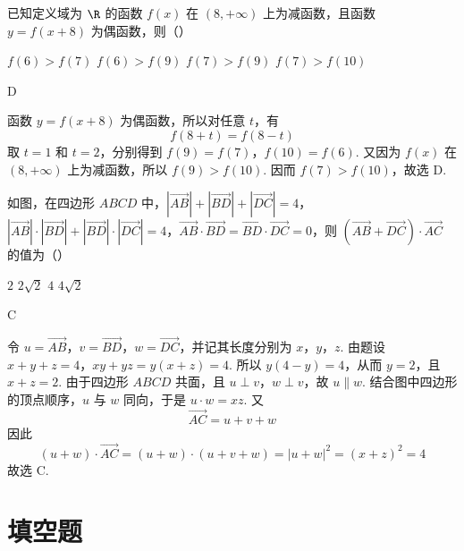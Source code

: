 \begin{problem}
已知定义域为 \(\R\) 的函数 \(f(x)\) 在 \((8, +\infty)\) 上为减函数，且函数 \(y = f(x + 8)\) 为偶函数，则（\quad）

\choices
    {\(f(6) > f(7)\)}
    {\(f(6) > f(9)\)}
    {\(f(7) > f(9)\)}
    {\(f(7) > f(10)\)}
\end{problem}

\begin{answer}
D
\end{answer}

\begin{solution}
函数 \(y=f(x+8)\) 为偶函数，所以对任意 \(t\)，有
\[
f(8+t)=f(8-t)
\]
取 \(t=1\) 和 \(t=2\)，分别得到 \(f(9)=f(7)\)，\(f(10)=f(6)\). 又因为 \(f(x)\) 在 \((8,+\infty)\) 上为减函数，所以 \(f(9)>f(10)\). 因而 \(f(7)>f(10)\)，故选 D.
\end{solution}

\begin{problem}
如图，在四边形 \(ABCD\) 中，\(\left|\overrightarrow{AB}\right| + \left|\overrightarrow{BD}\right| + \left|\overrightarrow{DC}\right| = 4\)，\(\left|\overrightarrow{AB}\right| \cdot \left|\overrightarrow{BD}\right| + \left|\overrightarrow{BD}\right| \cdot \left|\overrightarrow{DC}\right| = 4\)，\(\overrightarrow{AB} \cdot \overrightarrow{BD} = \overrightarrow{BD} \cdot \overrightarrow{DC} = 0\)，则 \(\left(\overrightarrow{AB} + \overrightarrow{DC}\right) \cdot \overrightarrow{AC}\) 的值为（\quad）


\choices
    {\(2\)}
    {\(2 \sqrt{2}\)}
    {\(4\)}
    {\(4 \sqrt{2}\)}
\end{problem}

\begin{answer}
C
\end{answer}

\begin{solution}
令 \(u=\overrightarrow{AB}\)，\(v=\overrightarrow{BD}\)，\(w=\overrightarrow{DC}\)，并记其长度分别为 \(x\)，\(y\)，\(z\). 由题设
\(x+y+z=4\)，\(xy+yz=y(x+z)=4\).
所以 \(y(4-y)=4\)，从而 \(y=2\)，且 \(x+z=2\). 由于四边形 \(ABCD\) 共面，且 \(u\perp v\)，\(w\perp v\)，故 \(u\parallel w\). 结合图中四边形的顶点顺序，\(u\) 与 \(w\) 同向，于是 \(u\cdot w=xz\). 又
\[
\overrightarrow{AC}=u+v+w
\]
因此
\[
(u+w)\cdot\overrightarrow{AC}=(u+w)\cdot(u+v+w)=|u+w|^2=(x+z)^2=4
\]
故选 C.
\end{solution}

\section{填空题}

